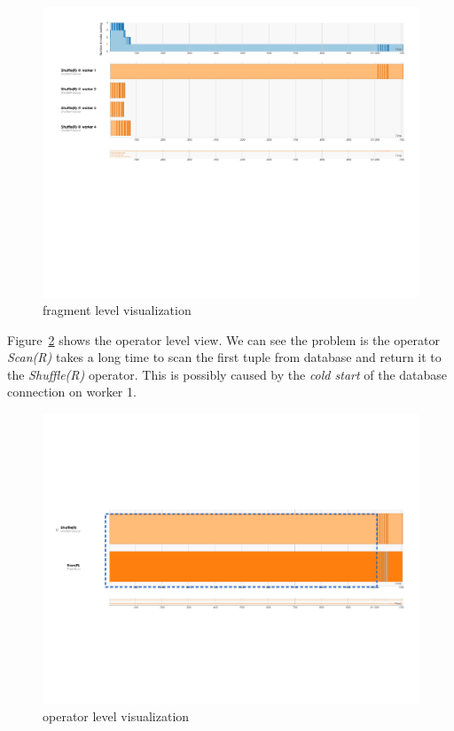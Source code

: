 \documentclass[11pt]{scrartcl}
\begin{document}
\begin{figure}[h]
  \begin{center}
    \includegraphics[width=\textwidth]{slow_worker_fragment.pdf}
  \end{center}
  \caption{fragment level visualization}
  \label{fig:slow_worker_fragment}
\end{figure}

Figure~\ref{fig:slow_worker_operator} shows the operator level view. We can see the problem is the operator \emph{Scan(R)} takes a long time to scan the first tuple from database and return it to the \emph{Shuffle(R)} operator. This is possibly caused by the \emph{cold start} of the database connection on worker 1.

\begin{figure}[h]
  \begin{center}
    \includegraphics[width=\textwidth]{slow_worker_operator.pdf}
  \end{center}
  \caption{operator level visualization}
  \label{fig:slow_worker_operator}
\end{figure}
\end{document}
